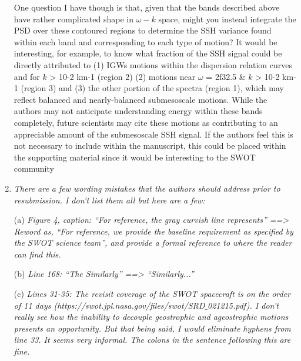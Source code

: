 \documentclass[11pt]{article}
\begin{document}
\begin{enumerate}
{One question I have though is that, given that the bands described above have rather
complicated shape in $\omega-k$ space, might you instead integrate the PSD over these contoured
regions to determine the SSH variance found within each band and corresponding to each
type of motion? It would be interesting, for example, to know what fraction of the SSH signal
could be directly attributed to (1) IGWs motions within the dispersion relation curves and for
$k$ > 10-2 km-1 (region 2) (2) motions near $\omega$ = 2f32.5 \& $k$ > 10-2 km-1 (region 3) and (3) the
other portion of the spectra (region 1), which may reflect balanced and nearly-balanced
submesoscale motions. While the authors may not anticipate understanding energy within
these bands completely, future scientists may cite these motions as contributing to an
appreciable amount of the submesoscale SSH signal. If the authors feel this is not necessary
to include within the manuscript, this could be placed within the supporting material since it
would be interesting to the SWOT community}

\item{\it  There are a few wording mistakes that the authors should address prior to resubmission. I
don’t list them all but here are a few:}

  \subitem (a) {\it Figure 4, caption: “For reference, the gray curvish line represents” ==> Reword as,
  “For reference, we provide the baseline requirement as specified by the SWOT
  science team”, and provide a formal reference to where the reader can find this.}

  \subitem (b) {\it   Line 168: “The Similarly” ==> “Similarly...''}

  \subitem (c) {\it Lines 31-35: The revisit coverage of the SWOT spacecraft is on the order of 11 days
  (https://swot.jpl.nasa.gov/files/swot/SRD$\_$021215.pdf). I don’t really see how the
  inability to decouple geostrophic and ageostrophic motions presents an opportunity.
  But that being said, I would eliminate hyphens from line 33. It seems very informal.
  The colons in the sentence following this are fine.}


\end{enumerate}


\end{document}

